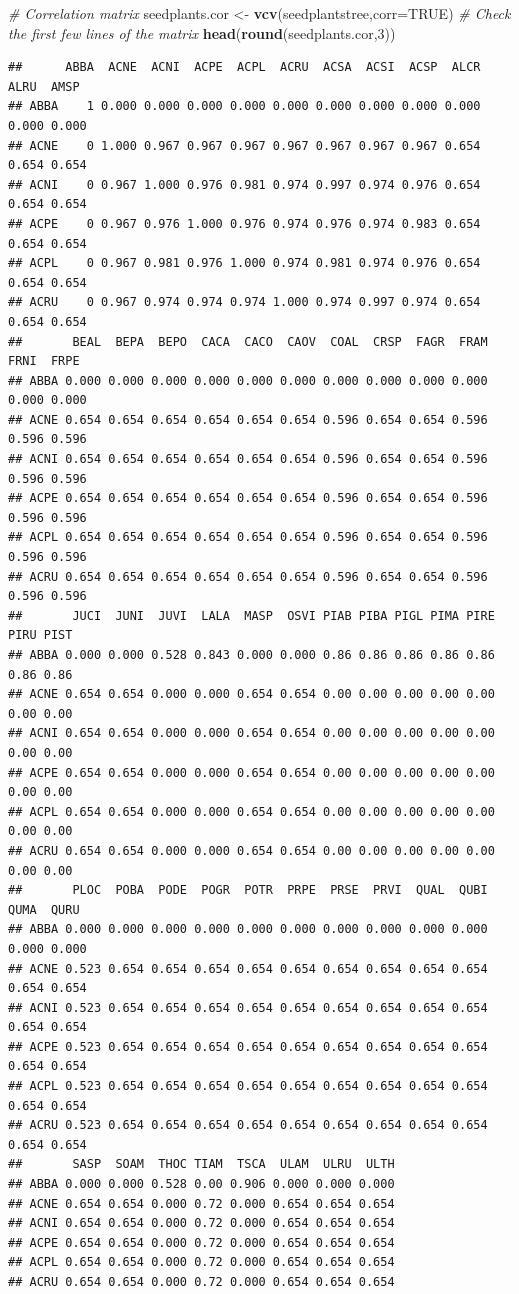 \documentclass[
]{book}
\newenvironment{Shaded}{\begin{snugshade}}{\end{snugshade}}
\newcommand{\AttributeTok}[1]{\textcolor[rgb]{0.13,0.29,0.53}{#1}}
\newcommand{\CommentTok}[1]{\textcolor[rgb]{0.56,0.35,0.01}{\textit{#1}}}
\newcommand{\ConstantTok}[1]{\textcolor[rgb]{0.56,0.35,0.01}{#1}}
\newcommand{\DecValTok}[1]{\textcolor[rgb]{0.00,0.00,0.81}{#1}}
\newcommand{\FunctionTok}[1]{\textcolor[rgb]{0.13,0.29,0.53}{\textbf{#1}}}
\newcommand{\NormalTok}[1]{#1}
\newcommand{\OtherTok}[1]{\textcolor[rgb]{0.56,0.35,0.01}{#1}}
\begin{document}
\begin{Shaded}
\begin{Highlighting}[]
\CommentTok{\# Correlation matrix}
\NormalTok{seedplants.cor }\OtherTok{\textless{}{-}} \FunctionTok{vcv}\NormalTok{(seedplantstree,}\AttributeTok{corr=}\ConstantTok{TRUE}\NormalTok{)}
\CommentTok{\# Check the first few lines of the matrix}
\FunctionTok{head}\NormalTok{(}\FunctionTok{round}\NormalTok{(seedplants.cor,}\DecValTok{3}\NormalTok{))}
\end{Highlighting}
\end{Shaded}

\begin{verbatim}
##      ABBA  ACNE  ACNI  ACPE  ACPL  ACRU  ACSA  ACSI  ACSP  ALCR  ALRU  AMSP
## ABBA    1 0.000 0.000 0.000 0.000 0.000 0.000 0.000 0.000 0.000 0.000 0.000
## ACNE    0 1.000 0.967 0.967 0.967 0.967 0.967 0.967 0.967 0.654 0.654 0.654
## ACNI    0 0.967 1.000 0.976 0.981 0.974 0.997 0.974 0.976 0.654 0.654 0.654
## ACPE    0 0.967 0.976 1.000 0.976 0.974 0.976 0.974 0.983 0.654 0.654 0.654
## ACPL    0 0.967 0.981 0.976 1.000 0.974 0.981 0.974 0.976 0.654 0.654 0.654
## ACRU    0 0.967 0.974 0.974 0.974 1.000 0.974 0.997 0.974 0.654 0.654 0.654
##       BEAL  BEPA  BEPO  CACA  CACO  CAOV  COAL  CRSP  FAGR  FRAM  FRNI  FRPE
## ABBA 0.000 0.000 0.000 0.000 0.000 0.000 0.000 0.000 0.000 0.000 0.000 0.000
## ACNE 0.654 0.654 0.654 0.654 0.654 0.654 0.596 0.654 0.654 0.596 0.596 0.596
## ACNI 0.654 0.654 0.654 0.654 0.654 0.654 0.596 0.654 0.654 0.596 0.596 0.596
## ACPE 0.654 0.654 0.654 0.654 0.654 0.654 0.596 0.654 0.654 0.596 0.596 0.596
## ACPL 0.654 0.654 0.654 0.654 0.654 0.654 0.596 0.654 0.654 0.596 0.596 0.596
## ACRU 0.654 0.654 0.654 0.654 0.654 0.654 0.596 0.654 0.654 0.596 0.596 0.596
##       JUCI  JUNI  JUVI  LALA  MASP  OSVI PIAB PIBA PIGL PIMA PIRE PIRU PIST
## ABBA 0.000 0.000 0.528 0.843 0.000 0.000 0.86 0.86 0.86 0.86 0.86 0.86 0.86
## ACNE 0.654 0.654 0.000 0.000 0.654 0.654 0.00 0.00 0.00 0.00 0.00 0.00 0.00
## ACNI 0.654 0.654 0.000 0.000 0.654 0.654 0.00 0.00 0.00 0.00 0.00 0.00 0.00
## ACPE 0.654 0.654 0.000 0.000 0.654 0.654 0.00 0.00 0.00 0.00 0.00 0.00 0.00
## ACPL 0.654 0.654 0.000 0.000 0.654 0.654 0.00 0.00 0.00 0.00 0.00 0.00 0.00
## ACRU 0.654 0.654 0.000 0.000 0.654 0.654 0.00 0.00 0.00 0.00 0.00 0.00 0.00
##       PLOC  POBA  PODE  POGR  POTR  PRPE  PRSE  PRVI  QUAL  QUBI  QUMA  QURU
## ABBA 0.000 0.000 0.000 0.000 0.000 0.000 0.000 0.000 0.000 0.000 0.000 0.000
## ACNE 0.523 0.654 0.654 0.654 0.654 0.654 0.654 0.654 0.654 0.654 0.654 0.654
## ACNI 0.523 0.654 0.654 0.654 0.654 0.654 0.654 0.654 0.654 0.654 0.654 0.654
## ACPE 0.523 0.654 0.654 0.654 0.654 0.654 0.654 0.654 0.654 0.654 0.654 0.654
## ACPL 0.523 0.654 0.654 0.654 0.654 0.654 0.654 0.654 0.654 0.654 0.654 0.654
## ACRU 0.523 0.654 0.654 0.654 0.654 0.654 0.654 0.654 0.654 0.654 0.654 0.654
##       SASP  SOAM  THOC TIAM  TSCA  ULAM  ULRU  ULTH
## ABBA 0.000 0.000 0.528 0.00 0.906 0.000 0.000 0.000
## ACNE 0.654 0.654 0.000 0.72 0.000 0.654 0.654 0.654
## ACNI 0.654 0.654 0.000 0.72 0.000 0.654 0.654 0.654
## ACPE 0.654 0.654 0.000 0.72 0.000 0.654 0.654 0.654
## ACPL 0.654 0.654 0.000 0.72 0.000 0.654 0.654 0.654
## ACRU 0.654 0.654 0.000 0.72 0.000 0.654 0.654 0.654
\end{verbatim}
\end{document}
